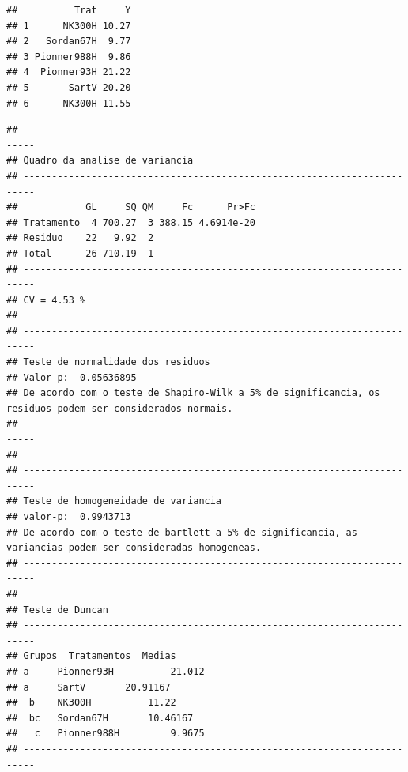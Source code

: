 \documentclass[
]{book}
\newenvironment{Shaded}{\begin{snugshade}}{\end{snugshade}}
\newcommand{\CommentTok}[1]{\textcolor[rgb]{0.56,0.35,0.01}{\textit{#1}}}
\newcommand{\DataTypeTok}[1]{\textcolor[rgb]{0.13,0.29,0.53}{#1}}
\newcommand{\FloatTok}[1]{\textcolor[rgb]{0.00,0.00,0.81}{#1}}
\newcommand{\KeywordTok}[1]{\textcolor[rgb]{0.13,0.29,0.53}{\textbf{#1}}}
\newcommand{\NormalTok}[1]{#1}
\newcommand{\OperatorTok}[1]{\textcolor[rgb]{0.81,0.36,0.00}{\textbf{#1}}}
\newcommand{\StringTok}[1]{\textcolor[rgb]{0.31,0.60,0.02}{#1}}
\begin{document}
\begin{verbatim}
##          Trat     Y
## 1      NK300H 10.27
## 2   Sordan67H  9.77
## 3 Pionner988H  9.86
## 4  Pionner93H 21.22
## 5       SartV 20.20
## 6      NK300H 11.55
\end{verbatim}

\begin{Shaded}
\end{Shaded}

\begin{verbatim}
## ------------------------------------------------------------------------
## Quadro da analise de variancia
## ------------------------------------------------------------------------
##            GL     SQ QM     Fc      Pr>Fc
## Tratamento  4 700.27  3 388.15 4.6914e-20
## Residuo    22   9.92  2                  
## Total      26 710.19  1                  
## ------------------------------------------------------------------------
## CV = 4.53 %
## 
## ------------------------------------------------------------------------
## Teste de normalidade dos residuos 
## Valor-p:  0.05636895 
## De acordo com o teste de Shapiro-Wilk a 5% de significancia, os residuos podem ser considerados normais.
## ------------------------------------------------------------------------
## 
## ------------------------------------------------------------------------
## Teste de homogeneidade de variancia 
## valor-p:  0.9943713 
## De acordo com o teste de bartlett a 5% de significancia, as variancias podem ser consideradas homogeneas.
## ------------------------------------------------------------------------
## 
## Teste de Duncan 
## ------------------------------------------------------------------------
## Grupos  Tratamentos  Medias
## a 	 Pionner93H 	     21.012 
## a 	 SartV 	     20.91167 
##  b 	 NK300H 	     11.22 
##  bc 	 Sordan67H 	     10.46167 
##   c 	 Pionner988H 	     9.9675 
## ------------------------------------------------------------------------
\end{verbatim}
\end{document}
